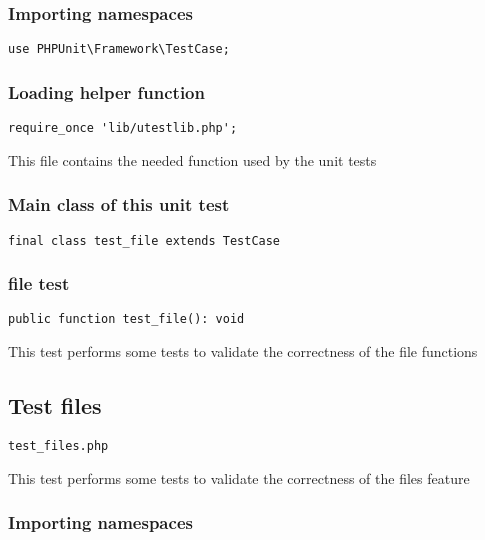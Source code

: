 \documentclass[a4paper]{article}
\begin{document}
\subsubsection{Importing namespaces}

\begin{lstlisting}
use PHPUnit\Framework\TestCase;
\end{lstlisting}

\hypertarget{toc171}{}
\subsubsection{Loading helper function}

\begin{lstlisting}
require_once 'lib/utestlib.php';
\end{lstlisting}

This file contains the needed function used by the unit tests

\hypertarget{toc172}{}
\subsubsection{Main class of this unit test}

\begin{lstlisting}
final class test_file extends TestCase
\end{lstlisting}

\hypertarget{toc173}{}
\subsubsection{file test}

\begin{lstlisting}
public function test_file(): void
\end{lstlisting}

This test performs some tests to validate the correctness
of the file functions

\hypertarget{toc174}{}
\subsection{Test files}

\begin{lstlisting}
test_files.php
\end{lstlisting}

This test performs some tests to validate the correctness
of the files feature

\hypertarget{toc175}{}
\subsubsection{Importing namespaces}
\end{document}
